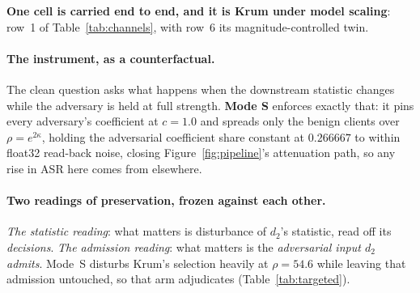 \documentclass{article}
\begin{document}
\noindent \textbf{One cell is carried end to end, and it is Krum under model scaling}: row~1 of Table~\ref{tab:channels}, with row~6 its magnitude-controlled twin.

\paragraph{The instrument, as a counterfactual.} The clean question asks what happens when the downstream statistic changes while the adversary is held at full strength. \textbf{Mode S} enforces exactly that: it pins every adversary's coefficient at $c{=}1.0$ and spreads only the benign clients over $\rho = e^{2\kappa}$, holding the adversarial coefficient share constant at $0.266667$ to within float32 read-back noise, closing Figure~\ref{fig:pipeline}'s attenuation path, so any rise in ASR here comes from elsewhere.

\paragraph{Two readings of preservation, frozen against each other.} \emph{The statistic reading}: what matters is disturbance of $d_2$'s statistic, read off its \emph{decisions}. \emph{The admission reading}: what matters is the \emph{adversarial input $d_2$ admits}. Mode~S disturbs Krum's selection heavily at $\rho{=}54.6$ while leaving that admission untouched, so that arm adjudicates (Table~\ref{tab:targeted}).
\end{document}
